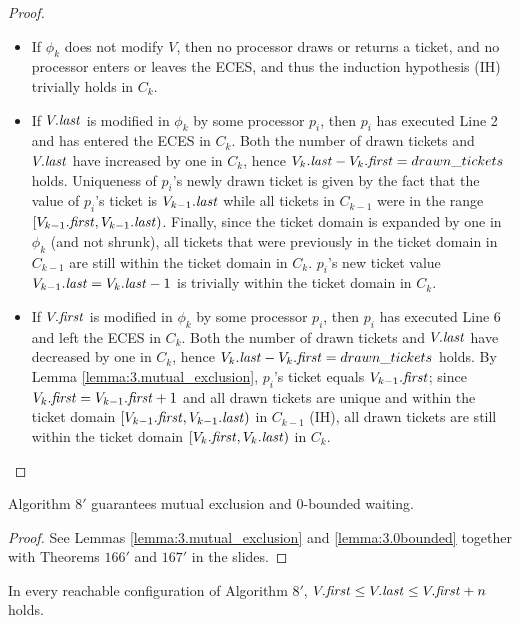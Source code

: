 \begin{proof}
\begin{itemize}
\item If $\phi_k$ does not modify $V$, then no processor draws or returns a ticket,
      and no processor enters or leaves the ECES, and thus the induction hypothesis (IH)
      trivially holds in $C_k$.
\item If $V.\mathit{last}$ is modified in $\phi_k$ by some processor $p_i$, then $p_i$ has executed
      Line 2 and has entered the ECES in $C_k$. Both the number of drawn tickets
      and $V.\mathit{last}$ have increased by one in $C_k$, hence $V_k.\mathit{last} - V_k.\mathit{first} = drawn\_tickets$
      holds. Uniqueness of $p_i$'s newly drawn ticket is given by the fact that
      the value of $p_i$'s ticket is $V_{k-1}.\mathit{last}$ while all tickets in $C_{k-1}$
      were in the range $[V_{k-1}.\mathit{first}, V_{k-1}.\mathit{last})$. Finally, since the ticket domain
      is expanded by one in $\phi_k$ (and not shrunk), all tickets that were previously
      in the ticket domain in $C_{k-1}$ are still within the ticket domain in $C_k$.
      $p_i$'s new ticket value $V_{k-1}.\mathit{last} = V_k.\mathit{last} - 1$ is trivially within
      the ticket domain in $C_k$.
\item If $V.\mathit{first}$ is modified in $\phi_k$ by some processor $p_i$, then $p_i$ has executed
      Line 6 and left the ECES in $C_k$. Both the number of drawn tickets
      and $V.\mathit{last}$ have decreased by one in $C_k$, hence
      $V_k.\mathit{last} - V_k.\mathit{first} = drawn\_tickets$ holds.
      By Lemma \ref{lemma:3.mutual_exclusion}, $p_i$'s ticket equals $V_{k-1}.\mathit{first}$;
      since $V_k.\mathit{first} = V_{k-1}.\mathit{first} + 1$ and all drawn tickets are unique
      and within the ticket domain $[V_{k-1}.\mathit{first}, V_{k-1}.\mathit{last})$ in $C_{k-1}$ (IH),
      all drawn tickets are still within the ticket domain $[V_k.\mathit{first}, V_k.\mathit{last})$
      in $C_k$.
\end{itemize}

\end{proof}

\begin{theorem}
Algorithm $8'$ guarantees mutual exclusion and 0-bounded waiting.
\end{theorem}

\begin{proof}
See Lemmas \ref{lemma:3.mutual_exclusion} and \ref{lemma:3.0bounded} together with
Theorems $166'$ and $167'$ in the slides.
\end{proof}


\begin{lemma} \label{lemma:3.Vbounds}
In every reachable configuration of Algorithm $8'$,
$V.\mathit{first} \leq V.\mathit{last} \leq V.\mathit{first}+n$ holds.
\end{lemma}

